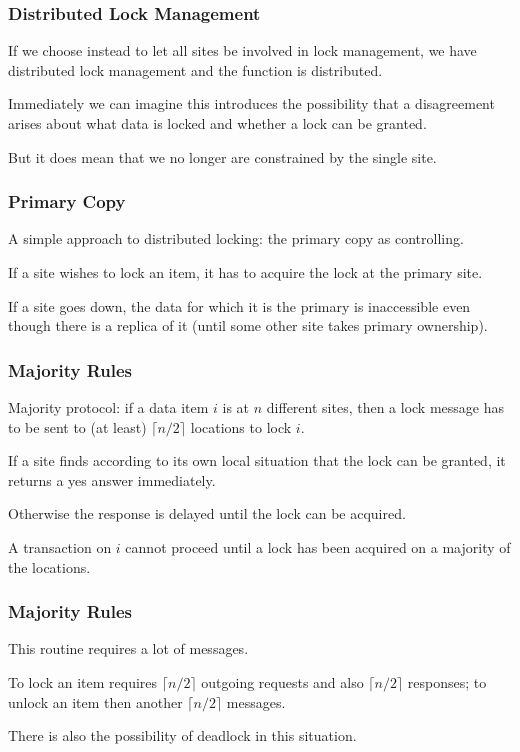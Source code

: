 \begin{frame}
\frametitle{Distributed Lock Management}
If we choose instead to let all sites be involved in lock management, we have distributed lock management and the function is distributed. 

Immediately we can imagine this introduces the possibility that a disagreement arises about what data is locked and whether a lock can be granted.

But it does mean that we no longer are constrained by the single site. 

\end{frame}

\begin{frame}
\frametitle{Primary Copy}

A simple approach to distributed locking: the primary copy as controlling. 

If a site wishes to lock an item, it has to acquire the lock at the primary site. 

If a site goes down, the data for which it is the primary is inaccessible even though there is a replica of it (until some other site takes primary ownership).


\end{frame}

\begin{frame}
\frametitle{Majority Rules}

Majority protocol: if a data item $i$ is at $n$ different sites, then a lock message has to be sent to (at least) $\lceil n/2 \rceil$ locations to lock $i$. 

If a site finds according to its own local situation that the lock can be granted, it returns a yes answer immediately.

Otherwise the response is delayed until the lock can be acquired. 

A transaction on $i$ cannot proceed until a lock has been acquired on a majority of the locations.

\end{frame}


\begin{frame}
\frametitle{Majority Rules}

This routine requires a lot of messages. 

To lock an item requires $\lceil n/2 \rceil$ outgoing requests and also  $\lceil n/2 \rceil$ responses; to unlock an item then another $\lceil n/2 \rceil$ messages.

There is also the possibility of deadlock in this situation.

\end{frame}


